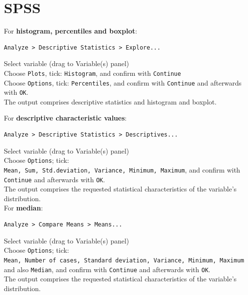 \documentclass[
]{book}
\begin{document}
\hypertarget{spss-3}{%
\section{SPSS}\label{spss-3}}

For \textbf{histogram, percentiles and boxplot}:

\begin{verbatim}
Analyze > Descriptive Statistics > Explore...
\end{verbatim}

Select variable (drag to Variable(s) panel)\\
Choose \texttt{Plots}, tick: \texttt{Histogram}, and confirm with \texttt{Continue}\\
Choose \texttt{Options}, tick: \texttt{Percentiles}, and confirm with \texttt{Continue} and
afterwards with \texttt{OK}.\\
The output comprises descriptive statistics and histogram and
boxplot.

For \textbf{descriptive characteristic values}:~

\begin{verbatim}
Analyze > Descriptive Statistics > Descriptives...
\end{verbatim}

Select variable (drag to Variable(s) panel)\\
Choose \texttt{Options}; tick:
\texttt{Mean,\ Sum,\ Std.deviation,\ Variance,\ Minimum,\ Maximum}, and confirm with
\texttt{Continue} and afterwards with \texttt{OK}.\\
The output comprises the requested statistical characteristics of the variable's distribution.\\

For \textbf{median}:\\

\begin{verbatim}
Analyze > Compare Means > Means...
\end{verbatim}

Select variable (drag to Variable(s) panel)\\
Choose \texttt{Options}; tick:
\texttt{Mean,\ Number\ of\ cases,\ Standard\ deviation,\ Variance,\ Minimum,\ Maximum}
and also \texttt{Median}, and confirm with \texttt{Continue} and afterwards with \texttt{OK}.\\
The output comprises the requested statistical characteristics of the variable's distribution.\\
\end{document}
